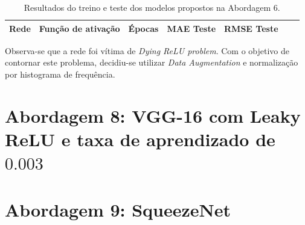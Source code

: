 \begin{table}[!ht]
	\centering
	\caption{Resultados do treino e teste dos modelos propostos na Abordagem 6.}
	\label{tab:results-2}
		\begin{tabular}{l l l l l l l}
			\toprule
			Rede & Função de ativação & Épocas & MAE Teste & RMSE Teste \\
			\midrule
			\bottomrule
		\end{tabular}
	\end{table}
	Observa-se que a rede foi vítima de \emph{Dying ReLU problem}. Com o objetivo de contornar este problema, decidiu-se utilizar \emph{Data Augmentation} e normalização por histograma de frequência.



\section{Abordagem 8: VGG-16 com Leaky ReLU e taxa de aprendizado de $0.003$}


\section{Abordagem 9: SqueezeNet}
